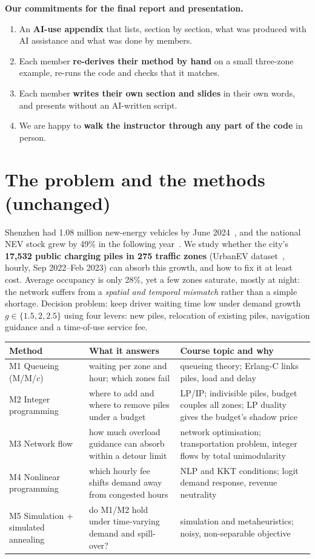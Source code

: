 \documentclass[11pt,a4paper]{article}
\begin{document}
\textbf{Our commitments for the final report and presentation.}
\begin{enumerate}[leftmargin=1.5em,itemsep=1pt]
\item An \textbf{AI-use appendix} that lists, section by section, what was produced with AI assistance and what was done by members.
\item Each member \textbf{re-derives their method by hand} on a small three-zone example, re-runs the code and checks that it matches.
\item Each member \textbf{writes their own section and slides} in their own words, and presents without an AI-written script.
\item We are happy to \textbf{walk the instructor through any part of the code} in person.
\end{enumerate}

\section{The problem and the methods (unchanged)}
Shenzhen had 1.08 million new-energy vehicles by June 2024~\cite{cnev2024}, and the national NEV stock grew by 49\% in the following year~\cite{cnev2025}. We study whether the city's \textbf{17{,}532 public charging piles in 275 traffic zones} (UrbanEV dataset~\cite{li2025urbanev}, hourly, Sep 2022--Feb 2023) can absorb this growth, and how to fix it at least cost. Average occupancy is only 28\%, yet a few zones saturate, mostly at night: the network suffers from a \emph{spatial and temporal mismatch} rather than a simple shortage. Decision problem: keep driver waiting time low under demand growth $g\in\{1.5,2,2.5\}$ using four levers: new piles, relocation of existing piles, navigation guidance and a time-of-use service fee.
\begin{center}\small
\begin{tabular}{@{}p{3.1cm}p{5.4cm}p{7.1cm}@{}}\toprule
Method & What it answers & Course topic and why\\\midrule
M1 Queueing (M/M/$c$) & waiting per zone and hour; which zones fail & queueing theory; Erlang-C links piles, load and delay\\
M2 Integer programming & where to add and where to remove piles under a budget & LP/IP; indivisible piles, budget couples all zones; LP duality gives the budget's shadow price\\
M3 Network flow & how much overload guidance can absorb within a detour limit & network optimisation; transportation problem, integer flows by total unimodularity\\
M4 Nonlinear programming & which hourly fee shifts demand away from congested hours & NLP and KKT conditions; logit demand response, revenue neutrality\\
M5 Simulation + simulated annealing & do M1/M2 hold under time-varying demand and spill-over? & simulation and metaheuristics; noisy, non-separable objective\\\bottomrule
\end{tabular}\end{center}
\end{document}
